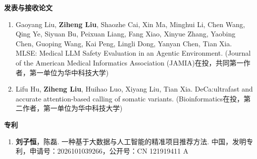 \begin{publications}
\noindent
\textbf{发表与接收论文}
\renewcommand{\labelenumi}{[\arabic{enumi}]}
\begin{enumerate}
\item Gaoyang Liu, \textbf{Ziheng Liu}, Shaozhe Cai, Xin Ma, Minghui Li, Chen Wang, Qing Ye, Siyuan Bu, Peixuan Liang, Fang Xiao, Xinyue Zhang, Yaobing Chen, Guoping Wang, Kai Peng, Lingli Dong, Yanyan Chen, Tian Xia. MLSE: Medical LLM Safety Evaluation in an Agentic Environment. (Journal of the American Medical Informatics Association (JAMIA)在投，共同第一作者，第一单位为华中科技大学)	
\item Lifu Hu, \textbf{Ziheng Liu}, Huihao Luo, Xiyang Liu, Tian Xia. DeCa:ultrafast and accurate attention-based calling of somatic variants. (Bioinformatics在投，第二作者，第一单位为华中科技大学)

\end{enumerate}
\textbf{专\hspace{2em}利}
\renewcommand{\labelenumi}{[\arabic{enumi}]}
\begin{enumerate}
\item \textbf{刘子恒}，陈磊. 一种基于大数据与人工智能的精准项目推荐方法. 中国，发明专利，申请号：2026101039266，公开号：CN 121919411 A
\end{enumerate}

\end{publications}















